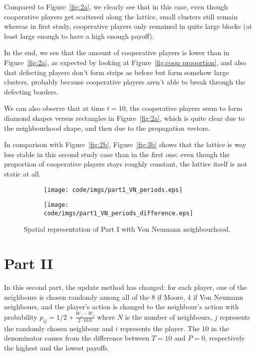 \documentclass{article}
\begin{document}
Compared to Figure~\ref{fig:2a}, we clearly see that in this case, even though cooperative players get
scattered along the lattice, small clusters still remain whereas in first study, cooperative players only
remained in quite large blocks (at least large enough to have a high enough payoff).

In the end, we see that the amount of cooperative players is lower than in Figure~\ref{fig:2a}, as expected
by looking at Figure~\ref{fig:coop proportion}, and also that defecting players don't form strips as before
but form somehow large clusters, probably because cooperative players aren't able to break through the
defecting borders.

We can also observe that at time $t=10$, the cooperative players seem to form diamond shapes versus rectangles
in Figure~\ref{fig:2a}, which is quite clear due to the neighbourhood shape, and then due to the propagation
vectors.

In comparison with Figure~\ref{fig:2b}, Figure~\ref{fig:3b} shows that the lattice is way less stable in this
second study case than in the first one: even though the proportion of cooperative players stays roughly
constant, the lattice itself is not static at all.

\begin{figure}%
		\begin{subfigure}{\textwidth}
		\hspace{-2.5cm}
		\vspace{-.5cm}
		\texttt{[image: code/imgs/part1\_VN\_periods.eps]}
	\end{subfigure}
	\begin{subfigure}{\textwidth}
		\centering
		\texttt{[image: code/imgs/part1\_VN\_periods\_difference.eps]}
	\end{subfigure}
	\caption{Spatial representation of Part I with Von Neumann neighbourhood.\label{fig:Spatial Representation Part I VN}}
\end{figure}

\newpage

\section{Part II}

In this second part, the update method has changed: for each player, one of the neighbours is chosen randomly
among all of the 8 if Moore, 4 if Von Neumann neighbours, and the player's action is changed to the neighbour's
action with probability $p_{ij} = 1/2 + \frac {W_j-W_i}{2 \cdot 10N}$ where $N$ is the number of neighbours,
$j$ represents the randomly chosen neighbour and $i$ represents the player. The $10$ in the denominator comes from
the difference between $T=10$ and $P=0$, respectively the highest and the lowest payoffs.
\end{document}
